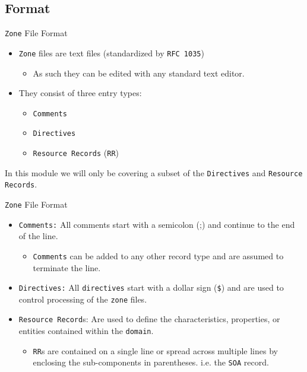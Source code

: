 \documentclass[aspectratio=169,xcolor=table]{beamer}
\begin{document}
\subsection{Format}
\begin{frame}{\texttt{Zone} File Format}
  \begin{itemize}
    \item \texttt{Zone} files are text files (standardized by \texttt{RFC 1035})
      \begin{itemize}
        \item As such they can be edited with any standard text editor.
      \end{itemize}
    \item They consist of three entry types:
      \begin{itemize}
        \item \texttt{Comments}
        \item \texttt{Directives}
        \item \texttt{Resource Records} (\texttt{RR})
      \end{itemize}
  \end{itemize}
  \begin{tcolorbox}[title={\textbf{NOTE:}}]
    In this module we will only be covering a subset of the \texttt{Directives} and \texttt{Resource Records}.
  \end{tcolorbox}  
\end{frame}

\begin{frame}{\texttt{Zone} File Format}
  \begin{itemize}
    \item \texttt{Comments:} All comments start with a semicolon (;) and continue to the end of the line. 
      \begin{itemize}
        \item \texttt{Comments} can be added to any other record type and are assumed to terminate the line.
      \end{itemize}
    \item \texttt{Directives:} All \texttt{directives} start with a dollar sign (\texttt{\$}) and are used to control processing of the \texttt{zone} files.
    \item \texttt{Resource Record}s: Are used to define the characteristics, properties, or entities contained within the \texttt{domain}. 
    \begin{itemize}
        \item \texttt{RR}s are contained on a single line or spread across multiple lines by enclosing the sub-components in parentheses. i.e. the \texttt{SOA} record.
      \end{itemize}
  \end{itemize}
\end{frame}
\end{document}

